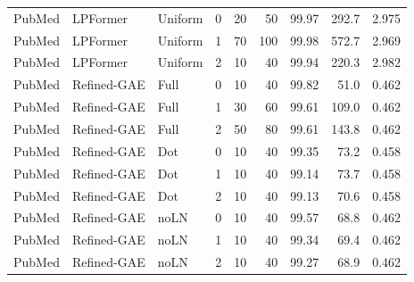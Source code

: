 {\begin{longtable}{lllrrrrrr}
PubMed & LPFormer & Uniform & 0 & 20 & 50 & 99.97 & 292.7 & 2.975 \\
PubMed & LPFormer & Uniform & 1 & 70 & 100 & 99.98 & 572.7 & 2.969 \\
PubMed & LPFormer & Uniform & 2 & 10 & 40 & 99.94 & 220.3 & 2.982 \\
PubMed & Refined-GAE & Full & 0 & 10 & 40 & 99.82 & 51.0 & 0.462 \\
PubMed & Refined-GAE & Full & 1 & 30 & 60 & 99.61 & 109.0 & 0.462 \\
PubMed & Refined-GAE & Full & 2 & 50 & 80 & 99.61 & 143.8 & 0.462 \\
PubMed & Refined-GAE & Dot & 0 & 10 & 40 & 99.35 & 73.2 & 0.458 \\
PubMed & Refined-GAE & Dot & 1 & 10 & 40 & 99.14 & 73.7 & 0.458 \\
PubMed & Refined-GAE & Dot & 2 & 10 & 40 & 99.13 & 70.6 & 0.458 \\
PubMed & Refined-GAE & noLN & 0 & 10 & 40 & 99.57 & 68.8 & 0.462 \\
PubMed & Refined-GAE & noLN & 1 & 10 & 40 & 99.34 & 69.4 & 0.462 \\
PubMed & Refined-GAE & noLN & 2 & 10 & 40 & 99.27 & 68.9 & 0.462 \\
\end{longtable}
}
